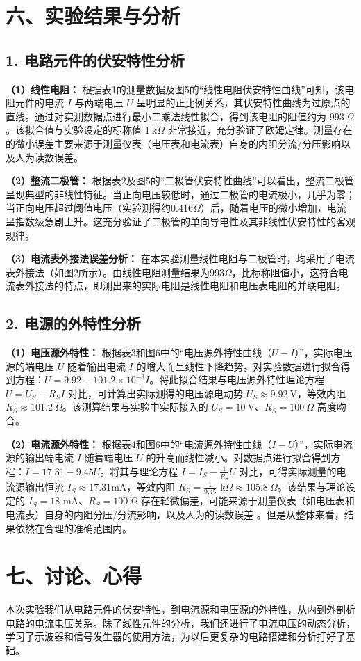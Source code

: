 ﻿\documentclass[10.5pt]{config}
\begin{document}
\section*{六、实验结果与分析}

\subsection*{1. 电路元件的伏安特性分析}
\textbf{（1）线性电阻：}
根据表1的测量数据及图5的“线性电阻伏安特性曲线”可知，该电阻元件的电流 $I$ 与两端电压 $U$ 呈明显的正比例关系，其伏安特性曲线为过原点的直线。通过对实测数据点进行最小二乘法线性拟合，得到该电阻的阻值约为 $993\ \Omega$。该拟合值与实验设定的标称值 $1\ \text{k}\Omega$ 非常接近，充分验证了欧姆定律。测量存在的微小误差主要来源于测量仪表（电压表和电流表）自身的内阻分流/分压影响以及人为读数误差。

\textbf{（2）整流二极管：}
根据表2及图5的“二极管伏安特性曲线”可以看出，整流二极管呈现典型的非线性特征。当正向电压较低时，通过二极管的电流极小，几乎为零；当正向电压超过阈值电压（实验测得约0.416$\Omega$）后，随着电压的微小增加，电流呈指数级急剧上升。这充分验证了二极管的单向导电性及其非线性伏安特性的客观规律。

\textbf{（3）电流表外接法误差分析：}
在本实验测量线性电阻与二极管时，均采用了电流表外接法（如图2所示）。由线性电阻测量结果为$993\Omega$，比标称阻值小，这符合电流表外接法的特点，即测出来的实际电阻是线性电阻和电压表电阻的并联电阻。
\subsection*{2. 电源的外特性分析}
\textbf{（1）电压源外特性：}
根据表3和图6中的“电压源外特性曲线（$U-I$）”，实际电压源的端电压 $U$ 随着输出电流 $I$ 的增大而呈线性下降趋势。对实验数据进行拟合得到方程：$U = 9.92 - 101.2 \times 10^{-3} I$。将此拟合结果与电压源外特性理论方程 $U = U_S - R_S I$ 对比，可计算出实际测得的电压源电动势 $U_S \approx 9.92\ \text{V}$，等效内阻 $R_S \approx 101.2\ \Omega$。该测算结果与实验中实际接入的 $U_S = 10\ \text{V}$、$R_S = 100\ \Omega$ 高度吻合。

\textbf{（2）电流源外特性：}
根据表4和图6中的“电流源外特性曲线（$I-U$）”，实际电流源的输出端电流 $I$ 随着端电压 $U$ 的升高而线性减小。对数据点进行拟合得到方程：$I = 17.31 - 9.45 U$。将其与理论方程 $I = I_S - \frac{1}{R_S} U$ 对比，可得实际测量的电流源输出恒流 $I_S \approx 17.31 \text{mA}$，等效内阻 $R_S = \frac{1}{9.45} \text{ k}\Omega \approx 105.8\ \Omega$。该结果与理论设定的 $I_S = 18\text{ mA}$、$R_S = 100\ \Omega$ 存在轻微偏差，可能来源于测量仪表（如电压表和电流表）自身的内阻分压/分流影响，以及人为的读数误差 。但是从整体来看，结果依然在合理的准确范围内。
\section*{七、讨论、心得}

本次实验我们从电路元件的伏安特性，到电流源和电压源的外特性，从内到外剖析电路的电流电压关系。除了线性元件的分析，我们还进行了电流电压的动态分析，学习了示波器和信号发生器的使用方法，为以后更复杂的电路搭建和分析打好了基础。
\end{document}
